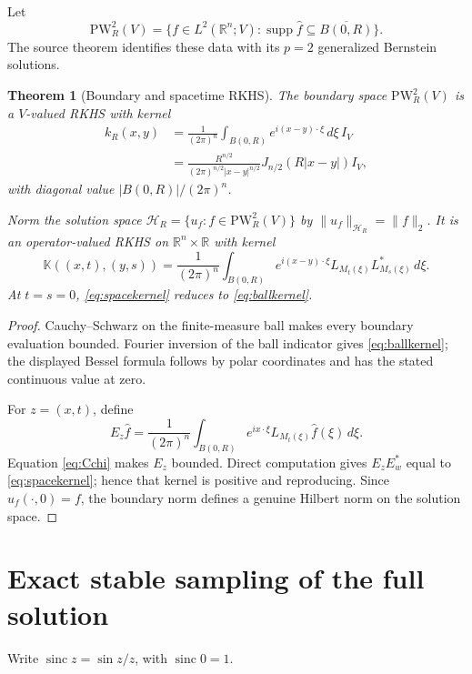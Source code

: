 \documentclass[10pt]{article}
\newtheorem{theorem}{Theorem}
\newcommand{\R}{\mathbb R}
\newcommand{\PW}{\mathrm{PW}}
\newcommand{\supp}{\operatorname{supp}}
\newcommand{\sinc}{\operatorname{sinc}}
\begin{document}
Let
\[
 \PW_R^2(V)=\{f\in L^2(\R^n;V):\supp\widehat f\subseteq\overline{B(0,R)}\}.
\]
The source theorem identifies these data with its $p=2$ generalized
Bernstein solutions.

\begin{theorem}[Boundary and spacetime RKHS]\label{thm:rkhs}
The boundary space $\PW_R^2(V)$ is a $V$-valued RKHS with kernel
\begin{align}
 k_R(x,y)
 &=\frac1{(2\pi)^n}\int_{B(0,R)}e^{i(x-y)\cdot\xi}\,d\xi\,I_V \label{eq:ballkernel}\\
 &=\frac{R^{n/2}}{(2\pi)^{n/2}|x-y|^{n/2}}
   J_{n/2}(R|x-y|)I_V, \nonumber
\end{align}
with diagonal value $|B(0,R)|/(2\pi)^n$.

Norm the solution space
$\mathcal H_R=\{u_f:f\in\PW_R^2(V)\}$ by $\|u_f\|_{\mathcal H_R}=\|f\|_2$.
It is an operator-valued RKHS on $\R^n\times\R$ with kernel
\begin{equation}\label{eq:spacekernel}
 \mathbb K((x,t),(y,s))
 =\frac1{(2\pi)^n}\int_{B(0,R)}e^{i(x-y)\cdot\xi}
 L_{M_t(\xi)}L_{M_s(\xi)}^*\,d\xi.
\end{equation}
At $t=s=0$, \eqref{eq:spacekernel} reduces to \eqref{eq:ballkernel}.
\end{theorem}

\begin{proof}
Cauchy--Schwarz on the finite-measure ball makes every boundary evaluation
bounded.  Fourier inversion of the ball indicator gives
\eqref{eq:ballkernel}; the displayed Bessel formula follows by polar
coordinates and has the stated continuous value at zero.

For $z=(x,t)$, define
\[
 E_z\widehat f=\frac1{(2\pi)^n}\int_{B(0,R)}e^{ix\cdot\xi}
 L_{M_t(\xi)}\widehat f(\xi)\,d\xi.
\]
Equation \eqref{eq:Cchi} makes $E_z$ bounded.  Direct computation gives
$E_zE_w^*$ equal to \eqref{eq:spacekernel}; hence that kernel is positive and
reproducing.  Since $u_f(\cdot,0)=f$, the boundary norm defines a genuine
Hilbert norm on the solution space.
\end{proof}

\section{Exact stable sampling of the full solution}

Write $\sinc z=\sin z/z$, with $\sinc0=1$.
\end{document}
